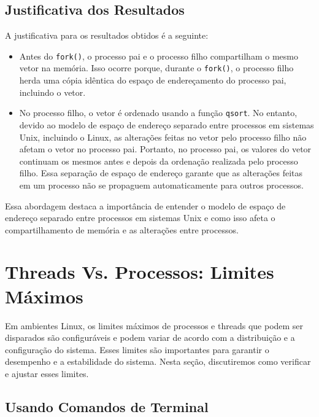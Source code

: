 \documentclass[
	12pt,				%
	openright,			%
	oneside,			%
	a4paper,			%
	chapter=TITLE,		%
	english,			%
	french,				%
	spanish,			%
	brazil				%
	]{abntex2}
\theoremstyle{definition}
\begin{document}
\subsection{Justificativa dos Resultados}

A justificativa para os resultados obtidos é a seguinte:

\begin{itemize}
    \item Antes do \texttt{fork()}, o processo pai e o processo filho compartilham o mesmo vetor na memória. Isso ocorre porque, durante o \texttt{fork()}, o processo filho herda uma cópia idêntica do espaço de endereçamento do processo pai, incluindo o vetor.

    \item No processo filho, o vetor é ordenado usando a função \texttt{qsort}. No entanto, devido ao modelo de espaço de endereço separado entre processos em sistemas Unix, incluindo o Linux, as alterações feitas no vetor pelo processo filho não afetam o vetor no processo pai. Portanto, no processo pai, os valores do vetor continuam os mesmos antes e depois da ordenação realizada pelo processo filho. Essa separação de espaço de endereço garante que as alterações feitas em um processo não se propaguem automaticamente para outros processos.

\end{itemize}

Essa abordagem destaca a importância de entender o modelo de espaço de endereço separado entre processos em sistemas Unix e como isso afeta o compartilhamento de memória e as alterações entre processos.

\section{Threads Vs. Processos: Limites Máximos}
Em ambientes Linux, os limites máximos de processos e threads que podem ser disparados são configuráveis e podem variar de acordo com a distribuição e a configuração do sistema. Esses limites são importantes para garantir o desempenho e a estabilidade do sistema. Nesta seção, discutiremos como verificar e ajustar esses limites.

\subsection{Usando Comandos de Terminal}
\end{document}
